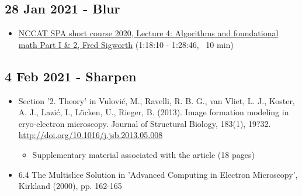 \documentclass[11pt, oneside]{article}   	%
\begin{document}
\pagebreak
\subsection{28 Jan 2021 - Blur}
\begin{itemize}
	\item \href{https://youtu.be/tzv5c5K7MEk?t=4690}{NCCAT SPA short course 2020, Lecture 4: Algorithms and foundational math Part I \& 2, Fred Sigworth} (1:18:10 - 1:28:46, ~10 min)
	\end{itemize}

\subsection{4 Feb 2021 - Sharpen}
\begin{itemize}
	\item Section '2. Theory' in Vulovi\'{c}, M., Ravelli, R. B. G., van Vliet, L. J., Koster, A. J., Lazi\'{c}, I., L\"ocken, U., Rieger, B. (2013). Image formation modeling in cryo-electron microscopy. Journal of Structural Biology, 183(1), 19?32. \url{http://doi.org/10.1016/j.jsb.2013.05.008}
	\begin{itemize}
		\item Supplementary material associated with the article (18 pages)
	\end{itemize}
	\item 6.4 The Multislice Solution in 'Advanced Computing in Electron Microscopy', Kirkland (2000), pp. 162-165
\end{itemize}
\end{document}
